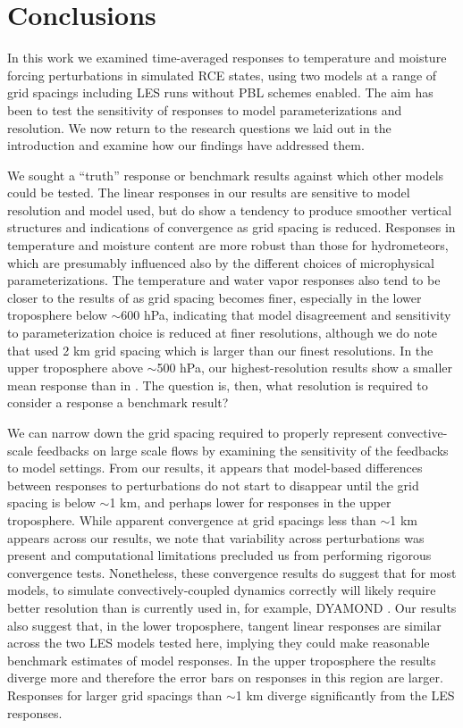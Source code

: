 \documentclass[draft]{agujournal2019}
\begin{document}
\section{Conclusions}
\label{sec:conclusions}

In this work we examined time-averaged responses to temperature and moisture
forcing perturbations in simulated RCE states, using two models at a range of
grid spacings including LES runs without PBL schemes enabled. The aim has been
to test the sensitivity of responses to model parameterizations and resolution.
We now return to the research questions we laid out in the introduction and
examine how our findings have addressed them.

We sought a ``truth'' response or benchmark results against which other models
could be tested. The linear responses in our results are sensitive to model
resolution and model used, but do show a tendency to produce smoother vertical
structures and indications of convergence as grid spacing is reduced. Responses
in temperature and moisture content are more robust than those for hydrometeors,
which are presumably influenced also by the different choices of microphysical
parameterizations. The temperature and water vapor responses also tend to be
closer to the results of  as grid spacing becomes finer,
especially in the lower troposphere below $\sim$600 hPa, indicating that model
disagreement and sensitivity to parameterization choice is reduced at finer
resolutions, although we do note that  used 2 km grid
spacing which is larger than our finest resolutions. In the upper troposphere
above $\sim$500 hPa, our highest-resolution results show a smaller mean response
than in . The question is, then, what resolution is
required to consider a response a benchmark result?

We can narrow down the grid spacing required to properly represent
convective-scale feedbacks on large scale flows by examining the sensitivity of
the feedbacks to model settings. From our results, it appears that model-based
differences between responses to perturbations do not start to disappear until
the grid spacing is below $\sim$1 km, and perhaps lower for responses in the
upper troposphere. While apparent convergence at grid spacings less than $\sim$1
km appears across our results, we note that variability across perturbations was
present and computational limitations precluded us from performing rigorous
convergence tests. Nonetheless, these convergence results do suggest that for
most models, to simulate convectively-coupled dynamics correctly will likely
require better resolution than is currently used in, for example, DYAMOND
\cite{Stevens_PEPS_2019}. Our results also suggest that, in the lower
troposphere, tangent linear responses are similar across the two LES models
tested here, implying they could make reasonable benchmark estimates of model
responses. In the upper troposphere the results diverge more and therefore the
error bars on responses in this region are larger. Responses for larger grid
spacings than $\sim$1 km diverge significantly from the LES responses.
\end{document}
